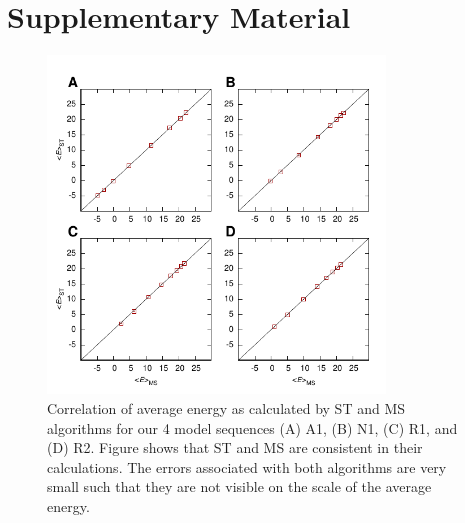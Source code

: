 \documentclass[12]{article}
\begin{document}
\section*{\LARGE{\textbf{Supplementary Material}}}

\begin{figure}[h]
\includegraphics[width=0.8\textwidth,center]{meanE}
\caption{ Correlation of average energy as calculated by ST and MS algorithms for our 4 model sequences (A) A1, (B) N1, (C) R1, and (D) R2. Figure shows that  ST and MS are consistent in their calculations. The errors associated with both algorithms are very small such that they are not visible on the scale of the average energy.}
\end{figure}
\end{document}
